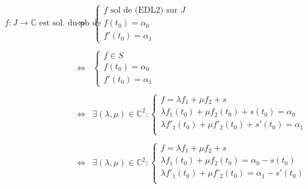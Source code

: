 \documentclass{article}
\begin{document}
\begin{question_kholle}
	$$\begin{array}{ccl}
			f : J \to \mathbb{C} \text{ est sol. du pb de Cauchy }
			 & \iff & \left\{ \begin{array}{l}
				                  f \text{ sol de (EDL2) sur } J \\
				                  f(t_{0}) = \alpha_{0}          \\
				                  f'(t_{0}) = \alpha_{1}
			                  \end{array}  \right.                                                                                \\\\
			 & \iff & \left\{ \begin{array}{l}
				                  f \in S               \\
				                  f(t_{0}) = \alpha_{0} \\
				                  f'(t_{0}) = \alpha_{1}
			                  \end{array}\right.                                                                                         \\\\
			 & \iff & \exists (\lambda, \mu) \in \mathbb{C}^{2}: \left\{ \begin{array}{l}
				                                                             f = \lambda f_{1} + \mu f_{2} + s                                  \\
				                                                             \lambda f_{1}(t_{0}) + \mu f_{2}(t_{0}) + s(t_{0}) = \alpha_{0}    \\
				                                                             \lambda f'_{1}(t_{0}) + \mu f'_{2}(t_{0}) + s'(t_{0}) = \alpha_{1} \\
			                                                             \end{array} \right. \\\\
			 & \iff & \exists (\lambda, \mu) \in \mathbb{C}^{2}: \left\{ \begin{array}{l}
				                                                             f = \lambda f_{1} + \mu f_{2} + s                                  \\
				                                                             \lambda f_{1}(t_{0}) + \mu f_{2}(t_{0}) = \alpha_{0} - s(t_{0})    \\
				                                                             \lambda f'_{1}(t_{0}) + \mu f'_{2}(t_{0}) = \alpha_{1} - s'(t_{0}) \\

\end{array}
\end{array}$$
\end{question_kholle}
\end{document}

